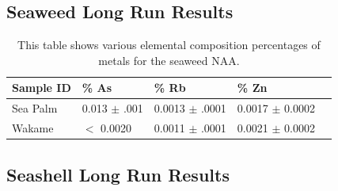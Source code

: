 \documentclass[]{article}
\begin{document}
\begin{table}[h]
\centering
\caption{ This table shows various elemental composition percentages of metals for the fish NAA.}
\end{table}




\subsection{Seaweed Long Run Results}

\begin{table}[h]
\centering
\caption{ This table shows various elemental composition percentages of metals for the seaweed NAA.}

\begin{tabular}{ | l | l | l | l | l | }
\hline
	Sample ID & \% As & \% Rb & \% Zn \\ \hline
	Sea Palm & 0.013 $\pm$ .001 & 0.0013 $\pm$ .0001 & 0.0017 $\pm$ 0.0002 \\ \hline
	Wakame & $<$ 0.0020 & 0.0011 $\pm$ .0001 & 0.0021 $\pm$ 0.0002 \\ \hline
\end{tabular}



\end{table}


\subsection{Seashell Long Run Results}
\end{document}
